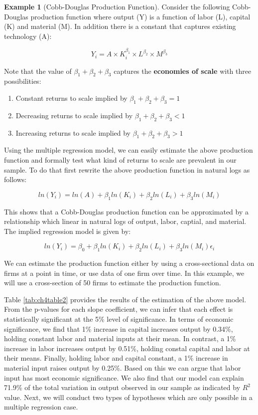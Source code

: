 \documentclass[
]{book}
\theoremstyle{definition}
\theoremstyle{definition}
\newtheorem{example}{Example}[chapter]
\theoremstyle{definition}
\theoremstyle{definition}
\theoremstyle{remark}
\begin{document}
\begin{example}[Cobb-Douglas Production Function]
\protect\hypertarget{exm:unnamed-chunk-78}{}\label{exm:unnamed-chunk-78}Consider the following Cobb-Douglas production function where output (Y) is a function of labor (L), capital (K) and material (M). In addition there is a constant that captures existing technology (A):

\[Y_i= A \times K_i^{\beta_1} \times  L^{\beta_2} \times M^{\beta_3}\]

Note that the value of \(\beta_1+\beta_2+\beta_3\) captures the \textbf{economies of scale} with three possibilities:

\begin{enumerate}
\def\labelenumi{\arabic{enumi}.}
\item
  Constant returns to scale implied by \(\beta_1+\beta_2+\beta_3=1\)
\item
  Decreasing returns to scale implied by \(\beta_1+\beta_2+\beta_3<1\)
\item
  Increasing returns to scale implied by \(\beta_1+\beta_2+\beta_3>1\)
\end{enumerate}

Using the multiple regression model, we can easily estimate the above production function and formally test what kind of returns to scale are prevalent in our sample. To do that first rewrite the above production function in natural logs as follows:

\[ln(Y_i) = ln(A) + \beta_1 ln (K_i) + \beta_2 ln (L_i)+\beta_3 ln (M_i)\]

This shows that a Cobb-Douglas production function can be approximated by a relationship which linear in natural logs of output, labor, captial, and material. The implied regression model is given by:

\[ln(Y_i) = \beta_0 + \beta_1 ln (K_i) + \beta_2 ln (L_i) +\beta_3 ln (M_i) \epsilon_i\]

We can estimate the production function either by using a cross-sectional data on firms at a point in time, or use data of one firm over time. In this example, we will use a cross-section of 50 firms to estimate the production function.

Table \ref{tab:ch4table2} provides the results of the estimation of the above model. From the p-values for each slope coefficient, we can infer that each effect is statistically significant at the 5\% level of significance. In terms of economic significance, we find that 1\% increase in capital increases output by 0.34\%, holding constant labor and material inputs at their mean. In contrast, a 1\% increase in labor increases output by 0.51\%, holding constal capital and labor at their means. Finally, holding labor and capital constant, a 1\% increase in material input raises output by 0.25\%. Based on this we can argue that labor input has most economic significance. We also find that our model can explain 71.9\% of the total variation in output observed in our sample as indicated by \(R^2\) value. Next, we will conduct two types of hypotheses which are only possible in a multiple regression case.
\end{example}
\end{document}
